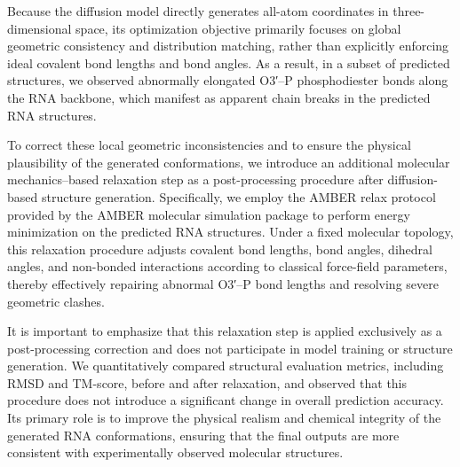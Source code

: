 Because the diffusion model directly generates all-atom coordinates in three-dimensional space, its optimization objective primarily focuses on global geometric consistency and distribution matching, rather than explicitly enforcing ideal covalent bond lengths and bond angles. As a result, in a subset of predicted structures, we observed abnormally elongated O3′–P phosphodiester bonds along the RNA backbone, which manifest as apparent chain breaks in the predicted RNA structures.

To correct these local geometric inconsistencies and to ensure the physical plausibility of the generated conformations, we introduce an additional molecular mechanics–based relaxation step as a post-processing procedure after diffusion-based structure generation. Specifically, we employ the AMBER relax protocol provided by the AMBER molecular simulation package to perform energy minimization on the predicted RNA structures\cite{case2023ambertools}. Under a fixed molecular topology, this relaxation procedure adjusts covalent bond lengths, bond angles, dihedral angles, and non-bonded interactions according to classical force-field parameters, thereby effectively repairing abnormal O3′–P bond lengths and resolving severe geometric clashes.

It is important to emphasize that this relaxation step is applied exclusively as a post-processing correction and does not participate in model training or structure generation. We quantitatively compared structural evaluation metrics, including RMSD and TM-score, before and after relaxation, and observed that this procedure does not introduce a significant change in overall prediction accuracy. Its primary role is to improve the physical realism and chemical integrity of the generated RNA conformations, ensuring that the final outputs are more consistent with experimentally observed molecular structures.

